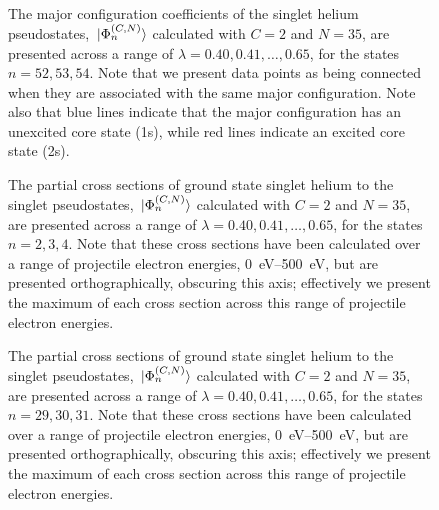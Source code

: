\documentclass[]{article}
\begin{document}
\begin{figure}[h]
  \begin{center}
    
  \end{center}
  \caption[Major Configuration Coefficients: Auto-Ionising III]{
    The major configuration coefficients of the singlet helium pseudostates,
    $\ket*{\Phi_{n}^{(C, N)}}$ calculated with $C = 2$ and $N = 35$, are
    presented across a range of $\lambda = 0.40, 0.41, \dotsc, 0.65$, for the
    states $n = 52, 53, 54$.
    Note that we present data points as being connected when they are associated
    with the same major configuration.
    Note also that blue lines indicate that the major configuration has an
    unexcited core state (1s), while red lines indicate an excited core state
    (2s).
  }
  \label{fig:mcc_53}
\end{figure}

\clearpage


\begin{figure}[h]
  \begin{center}
    
  \end{center}
  \caption[Partial Cross Sections: Singly-Excited]{
    The partial cross sections of ground state singlet helium to the singlet
    pseudostates, $\ket*{\Phi_{n}^{(C, N)}}$ calculated with $C = 2$ and
    $N = 35$, are presented across a range of
    $\lambda = 0.40, 0.41, \dotsc, 0.65$, for the states $n = 2, 3, 4$.
    Note that these cross sections have been calculated over a range of
    projectile electron energies, \SIrange{0}{500}{\eV}, but are presented
    orthographically, obscuring this axis; effectively we present the maximum of
    each cross section across this range of projectile electron energies.
  }
  \label{fig:pcs_3}
\end{figure}

\begin{figure}[h]
  \begin{center}
    
  \end{center}
  \caption[Partial Cross Sections: Auto-Ionising I]{
    The partial cross sections of ground state singlet helium to the singlet
    pseudostates, $\ket*{\Phi_{n}^{(C, N)}}$ calculated with $C = 2$ and
    $N = 35$, are presented across a range of
    $\lambda = 0.40, 0.41, \dotsc, 0.65$, for the states $n = 29, 30, 31$.
    Note that these cross sections have been calculated over a range of
    projectile electron energies, \SIrange{0}{500}{\eV}, but are presented
    orthographically, obscuring this axis; effectively we present the maximum of
    each cross section across this range of projectile electron energies.
  }
  \label{fig:pcs_30}
\end{figure}
\end{document}
